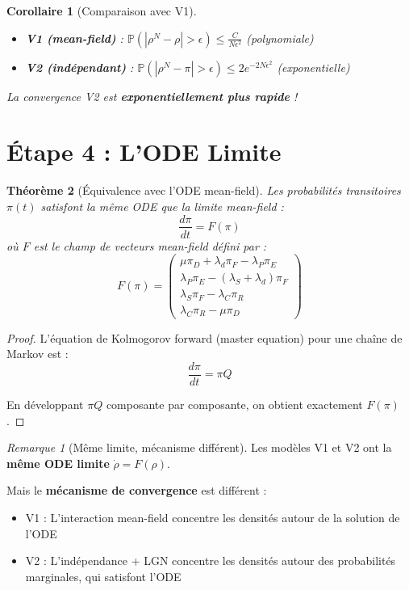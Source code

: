 \documentclass[11pt,a4paper]{article}
\theoremstyle{plain}
\newtheorem{theorem}{Théorème}[section]
\newtheorem{corollary}[theorem]{Corollaire}
\theoremstyle{definition}
\theoremstyle{remark}
\newtheorem*{remark}{Remarque}
\newcommand{\Prob}{\mathbb{P}}
\begin{document}
\begin{corollary}[Comparaison avec V1]
\begin{itemize}
    \item \textbf{V1 (mean-field)} : $\Prob(|\rho^N - \rho| > \epsilon) \leq \frac{C}{N\epsilon^2}$ (polynomiale)
    \item \textbf{V2 (indépendant)} : $\Prob(|\rho^N - \pi| > \epsilon) \leq 2e^{-2N\epsilon^2}$ (exponentielle)
\end{itemize}

La convergence V2 est \textbf{exponentiellement plus rapide} !
\end{corollary}

\section{Étape 4 : L'ODE Limite}

\begin{theorem}[Équivalence avec l'ODE mean-field]\label{thm:ode_equivalence}
Les probabilités transitoires $\pi(t)$ satisfont la même ODE que la limite mean-field :
\[
\frac{d\pi}{dt} = F(\pi)
\]
où $F$ est le champ de vecteurs mean-field défini par :
\[
F(\pi) = \begin{pmatrix}
\mu \pi_D + \lambda_d \pi_F - \lambda_P \pi_E \\
\lambda_P \pi_E - (\lambda_S + \lambda_d) \pi_F \\
\lambda_S \pi_F - \lambda_C \pi_R \\
\lambda_C \pi_R - \mu \pi_D
\end{pmatrix}
\]
\end{theorem}

\begin{proof}
L'équation de Kolmogorov forward (master equation) pour une chaîne de Markov est :
\[
\frac{d\pi}{dt} = \pi Q
\]

En développant $\pi Q$ composante par composante, on obtient exactement $F(\pi)$.
\end{proof}

\begin{remark}[Même limite, mécanisme différent]
Les modèles V1 et V2 ont la \textbf{même ODE limite} $\dot{\rho} = F(\rho)$.

Mais le \textbf{mécanisme de convergence} est différent :
\begin{itemize}
    \item V1 : L'interaction mean-field concentre les densités autour de la solution de l'ODE
    \item V2 : L'indépendance + LGN concentre les densités autour des probabilités marginales, qui satisfont l'ODE
\end{itemize}
\end{remark}
\end{document}
